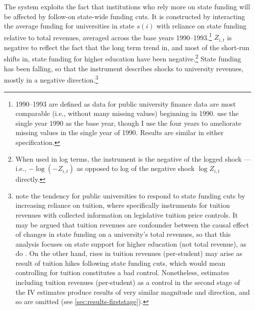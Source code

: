 The system exploits the fact that institutions who rely more on state funding will be affected by follow-on state-wide funding cuts.
It is constructed by interacting the average funding for universities in state $s(i)$ with reliance on state funding relative to total revenues, averaged across the base years 1990--1993.\footnote{
    1990--1993 are defined as data for public university finance data are most comparable (i.e., without many missing values) beginning in 1990.
    \cite{NBERw23736} use the single year 1990 as the base year, though I use the four years to ameliorate missing values in the single year of 1990.
    Results are similar in either specification.
}
$Z_{i,t}$ is negative to reflect the fact that the long term trend in, and most of the short-run shifts in, state funding for higher education have been negative.\footnote{
    When used in log terms, the instrument is the negative of the logged shock --- i.e., $- \log \left( -Z_{i,t} \right)$ as opposed to log of the negative shock $\log Z_{i,t}$ directly.
}
State funding has been falling, so that the instrument describes shocks to university revenues, mostly in a negative direction.\footnote{
    \label{foot:control}
    \cite{NBERw27885,webber2017state} note the tendency for public universities to respond to state funding cuts by increasing reliance on tuition, where \cite{NBERw23736} specifically instruments for tuition revenues with collected information on legislative tuition price controls.
    It may be argued that tuition revenues are confounder between the causal effect of changes in state funding on a university's total revenues, so that this analysis focuses on state support for higher education (not total revenue), as do \cite{NBERw27885}.
    On the other hand, rises in tuition revenues (per-student) may arise as result of tuition hikes following state funding cuts, which would mean controlling for tuition constitutes a bad control.
    Nonetheless, estimates including tuition revenues (per-student) as a control in the second stage of the IV estimates produce results of very similar magnitude and direction, and so are omitted (see \autoref{sec:results-firststage}).
}

